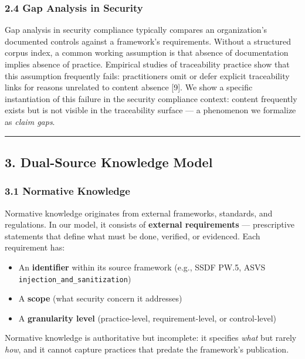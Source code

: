 \documentclass[
]{article}
\providecommand{\tightlist}{%
  \setlength{\itemsep}{0pt}\setlength{\parskip}{0pt}}
\begin{document}
\subsubsection{2.4 Gap Analysis in
Security}\label{gap-analysis-in-security}

Gap analysis in security compliance typically compares an organization's
documented controls against a framework's requirements. Without a
structured corpus index, a common working assumption is that absence of
documentation implies absence of practice. Empirical studies of
traceability practice show that this assumption frequently fails:
practitioners omit or defer explicit traceability links for reasons
unrelated to content absence {[}9{]}. We show a specific instantiation
of this failure in the security compliance context: content frequently
exists but is not visible in the traceability surface --- a phenomenon
we formalize as \emph{claim gaps}.

\begin{center}\rule{0.5\linewidth}{0.5pt}\end{center}

\subsection{3. Dual-Source Knowledge
Model}\label{dual-source-knowledge-model}

\subsubsection{3.1 Normative Knowledge}\label{normative-knowledge}

Normative knowledge originates from external frameworks, standards, and
regulations. In our model, it consists of \textbf{external requirements}
--- prescriptive statements that define what must be done, verified, or
evidenced. Each requirement has:

\begin{itemize}
\tightlist
\item
  An \textbf{identifier} within its source framework (e.g., SSDF PW.5,
  ASVS \texttt{injection\_and\_sanitization})
\item
  A \textbf{scope} (what security concern it addresses)
\item
  A \textbf{granularity level} (practice-level, requirement-level, or
  control-level)
\end{itemize}

Normative knowledge is authoritative but incomplete: it specifies
\emph{what} but rarely \emph{how}, and it cannot capture practices that
predate the framework's publication.
\end{document}
